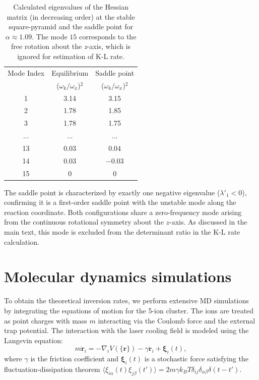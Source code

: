 \documentclass[aps,prl,twocolumn,superscriptaddress,showpacs,floatfix]{revtex4-2}
\begin{document}
\begin{table}[h!]
    \centering
    \begin{tabular}{c c c}
    \hline \hline
    Mode Index & Equilibrium & Saddle point \\
     & ($\omega_k/\omega_x$)$^2$ & ($\omega_k/\omega_x$)$^2$ \\
    \hline
    1 &  3.14 & 3.15 \\
    2 &  1.78 & 1.85 \\
    3 &  1.78 & 1.75 \\
    ... & ... & ... \\
    13 &  0.03 & 0.04 \\
    14 &  $\mathbf{0.03}$ & $\mathbf{-0.03}$ \\
    15 &  0 & 0 \\
    \hline \hline
    \end{tabular}
    \caption{Calculated eigenvalues of the Hessian matrix (in decreasing order) at the stable square-pyramid and the saddle point for $\alpha \approx 1.09$. The mode $15$ corresponds to the free rotation about the \textit{z}-axis, which is ignored for estimation of K-L rate.}
    \label{tab:frequencies}
\end{table}

The saddle point is characterized by exactly one negative eigenvalue ($\lambda'_1 < 0$), confirming it is a first-order saddle point with the unstable mode along the reaction coordinate. Both configurations share a zero-frequency mode arising from the continuous rotational symmetry about the $z$-axis. As discussed in the main text, this mode is excluded from the determinant ratio in the K-L rate calculation.

\section{Molecular dynamics simulations}

To obtain the theoretical inversion rates, we perform extensive MD simulations by integrating the equations of motion for the 5-ion cluster. The ions are treated as point charges with mass $m$ interacting via the Coulomb force and the external trap potential. The interaction with the laser cooling field is modeled using the Langevin equation:
\begin{equation}
m \ddot{\mathbf{r}}_i = -\nabla_i V(\{\mathbf{r}\}) - \gamma \dot{\mathbf{r}}_i + \boldsymbol{\xi}_i(t),
\end{equation}
where $\gamma$ is the friction coefficient and $\boldsymbol{\xi}_i(t)$ is a stochastic force satisfying the fluctuation-dissipation theorem $\langle \xi_{i\alpha}(t) \xi_{j\beta}(t') \rangle = 2 m \gamma k_B T \delta_{ij} \delta_{\alpha\beta} \delta(t-t')$.
\end{document}
